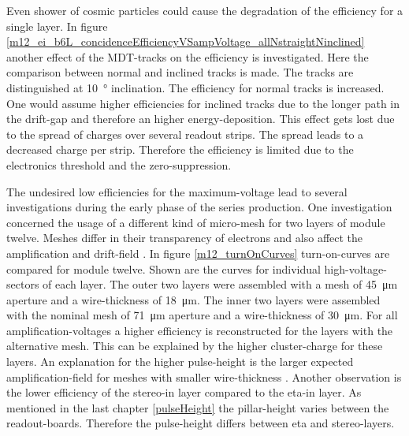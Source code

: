 \documentclass[
twoside,            %
BCOR1.4cm,          %
10pt,               %
headings=normal,    %
headsepline,        %
clearplainpage,		%
final,              %
div=14,
open=right,
bibliography=toc
]{scrreprt}
\begin{document}
Even shower of cosmic particles could cause the degradation of the efficiency for a single layer.
In figure \ref{m12_ei_b6L_concidenceEfficiencyVSampVoltage_allNstraightNinclined} another effect of the MDT-tracks on the efficiency is investigated.
Here the comparison between normal and inclined tracks is made.
The tracks are distinguished at \SI{10}{\degree} inclination.
The efficiency for normal tracks is increased.
One would assume higher efficiencies for inclined tracks due to the longer path in the drift-gap and therefore an higher energy-deposition.
This effect gets lost due to the spread of charges over several readout strips.
The spread leads to a decreased charge per strip. 
Therefore the efficiency is limited due to the electronics threshold and the zero-suppression.

The undesired low efficiencies for the maximum-voltage lead to several investigations during the early phase of the series production.
One investigation concerned the usage of a different kind of micro-mesh for two layers of module twelve.
Meshes differ in their transparency of electrons and also affect the amplification and drift-field \cite{kugerThesis}.
In figure \ref{m12_turnOnCurves} turn-on-curves are compared for module twelve.
Shown are the curves for individual high-voltage-sectors of each layer.
The outer two layers were assembled with a mesh of \SI{45}{\micro\m} aperture and a wire-thickness of \SI{18}{\micro\m}.
The inner two layers were assembled with the nominal mesh of \SI{71}{\micro\m} aperture and a wire-thickness of \SI{30}{\micro\m}.
For all amplification-voltages a higher efficiency is reconstructed for the layers with the alternative mesh.
This can be explained by the higher cluster-charge for these layers.
An explanation for the higher pulse-height is the larger expected amplification-field for meshes with smaller wire-thickness \cite{kugerThesis}.
Another observation is the lower efficiency of the stereo-in layer compared to the eta-in layer.
As mentioned in the last chapter \ref{pulseHeight} the pillar-height varies between the readout-boards.
Therefore the pulse-height differs between eta and stereo-layers.
\end{document}
